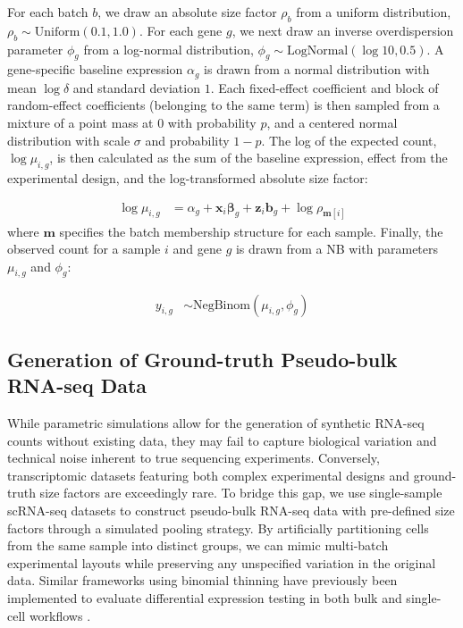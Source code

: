 \documentclass[10pt,letterpaper]{article}
\begin{document}
For each batch $b$, we draw an absolute size factor $\rho_b$ from a uniform distribution, $\rho_b \sim \text{Uniform}(0.1, 1.0)$.
For each gene $g$, we next draw an inverse overdispersion parameter $\phi_g$ from a log-normal distribution, $\phi_g \sim \text{LogNormal}(\log 10, 0.5)$.
A gene-specific baseline expression $\alpha_g$ is drawn from a normal distribution with mean $\log \delta$ and standard deviation $1$.
Each fixed-effect coefficient and block of random-effect coefficients (belonging to the same term) is then sampled from a mixture of a point mass at $0$ with probability $p$, and a centered normal distribution with scale $\sigma$ and probability $1 - p$.
The log of the expected count, $\log \mu_{i,g}$, is then calculated as the sum of the baseline expression, effect from the experimental design, and the log-transformed absolute size factor:

\begin{align}
    \log \mu_{i,g} &= \alpha_g + \boldsymbol{x}_i \boldsymbol{\beta}_g + \boldsymbol{z}_i \boldsymbol{b}_g + \log \rho_{\boldsymbol{m}[i]}
\end{align}
where $\boldsymbol{m}$ specifies the batch membership structure for each sample.
Finally, the observed count for a sample $i$ and gene $g$ is drawn from a NB with parameters $\mu_{i,g}$ and $\phi_g$:

\begin{align}
    y_{i,g} &\sim \text{NegBinom}(\mu_{i,g}, \phi_g)
\end{align}

\subsection*{Generation of Ground-truth Pseudo-bulk RNA-seq Data}

While parametric simulations allow for the generation of synthetic RNA-seq counts without existing data, they may fail to capture biological variation and technical noise inherent to true sequencing experiments. 
Conversely, transcriptomic datasets featuring both complex experimental designs and ground-truth size factors are exceedingly rare. 
To bridge this gap, we use single-sample scRNA-seq datasets to construct pseudo-bulk RNA-seq data with pre-defined size factors through a simulated pooling strategy. 
By artificially partitioning cells from the same sample into distinct groups, we can mimic multi-batch experimental layouts while preserving any unspecified variation in the original data.
Similar frameworks using binomial thinning have previously been implemented to evaluate differential expression testing in both bulk and single-cell workflows \cite{gerard_data-based_2020}.
\end{document}
